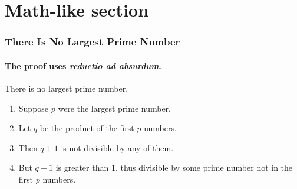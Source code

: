 \documentclass[aspectratio=169,11pt]{beamer}
\begin{document}
\section{Math-like section}
\begin{frame} 
\frametitle{There Is No Largest Prime Number} 
\framesubtitle{The proof uses \textit{reductio ad absurdum}.} 
\begin{theorem}
  There is no largest prime number.
\end{theorem} 
\begin{enumerate} 
  \item<1-| alert@1> Suppose $p$ were the largest prime number. 
  \item<2-> Let $q$ be the product of the first $p$ numbers. 
  \item<3-> Then $q+1$ is not divisible by any of them. 
  \item<1-> But $q + 1$ is greater than $1$, thus divisible by some prime number not in the first $p$ numbers.
\end{enumerate}
\end{frame}
\end{document}

